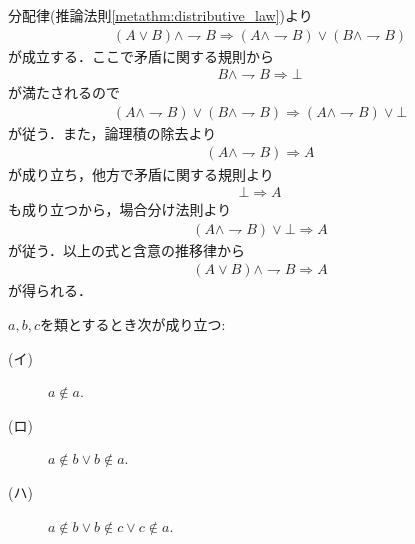 	\begin{prf}
		分配律(推論法則\ref{metathm:distributive_law})より
		\begin{align}
			(A \vee B) \wedge \rightharpoondown B
			\Longrightarrow (A \wedge \rightharpoondown B) \vee (B \wedge \rightharpoondown B)
		\end{align}
		が成立する．ここで矛盾に関する規則から
		\begin{align}
			B \wedge \rightharpoondown B \Longrightarrow \bot
		\end{align}
		が満たされるので
		\begin{align}
			(A \wedge \rightharpoondown B) \vee (B \wedge \rightharpoondown B)
			\Longrightarrow (A \wedge \rightharpoondown B) \vee \bot
		\end{align}
		が従う．また，論理積の除去より
		\begin{align}
			(A \wedge \rightharpoondown B) \Longrightarrow A
		\end{align}
		が成り立ち，他方で矛盾に関する規則より
		\begin{align}
			\bot \Longrightarrow A
		\end{align}
		も成り立つから，場合分け法則より
		\begin{align}
			(A \wedge \rightharpoondown B) \vee \bot \Longrightarrow A
		\end{align}
		が従う．以上の式と含意の推移律から
		\begin{align}
			(A \vee B) \wedge \rightharpoondown B \Longrightarrow A
		\end{align}
		が得られる．
		\QED
	\end{prf}
	
	\begin{screen}
		\begin{thm}[いかなる類も自分自身を要素に持たない]
		\label{thm:no_set_is_an_element_of_itself}
			$a,b,c$を類とするとき次が成り立つ:
			\begin{description}
				\item[(イ)] $a \notin a$.
				
				\item[(ロ)] $a \notin b \vee b \notin a$.
				
				\item[(ハ)] $a \notin b \vee b \notin c \vee c \notin a$.
			\end{description}
		\end{thm}
	\end{screen}
	
